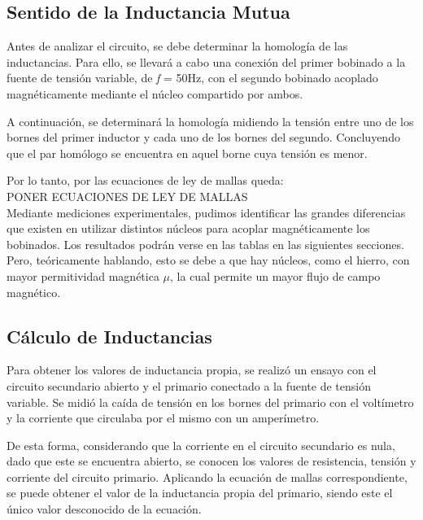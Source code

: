 \documentclass[a4paper,12pt]{article}
\begin{document}
\subsection{Sentido de la Inductancia Mutua}
\hspace{1cm} Antes de analizar el circuito, se debe determinar la homología de las inductancias. Para ello, se llevará
a cabo una conexión del primer bobinado a la fuente de tensión variable, de \textit{f} = 50Hz, con el segundo bobinado
acoplado magnéticamente mediante el núcleo compartido por ambos.

\hspace{1cm} A continuación, se determinará la homología midiendo la tensión entre uno de los bornes del primer inductor y 
cada uno de los bornes del segundo. Concluyendo que el par homólogo se encuentra en aquel borne cuya tensión es menor.

\hspace{1cm} Por lo tanto, por las ecuaciones de ley de mallas queda:
\\ PONER ECUACIONES DE LEY DE MALLAS
\\Mediante mediciones experimentales, pudimos identificar las grandes diferencias que existen en utilizar distintos
núcleos para acoplar magnéticamente los bobinados. Los resultados podrán verse en las tablas en las siguientes secciones. Pero,
teóricamente hablando, esto se debe a que hay núcleos, como el hierro, con mayor permitividad magnética $\mu$, 
la cual permite un mayor flujo de campo magnético.


\subsection{Cálculo de Inductancias}

\hspace{1cm} Para obtener los valores de inductancia propia, se realizó un ensayo con el circuito secundario abierto y el primario
conectado a la fuente de tensión variable. Se midió la caída de tensión en los bornes del primario con el voltímetro y la corriente
que circulaba por el mismo con un amperímetro.

\hspace{1cm} De esta forma, considerando que la corriente en el circuito secundario es nula, dado que este se encuentra abierto,
se conocen los valores de resistencia, tensión y corriente del circuito primario. Aplicando la ecuación de mallas correspondiente,
se puede obtener el valor de la inductancia propia del primario, siendo este el único valor desconocido de la ecuación.
\end{document}
